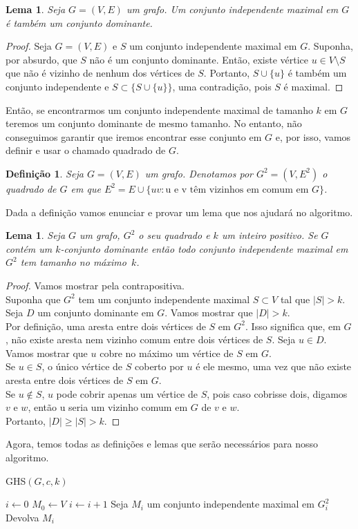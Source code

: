 \documentclass[12pt]{article}
\newtheorem{lemma}[theorem]{Lema}
\newtheorem{definition}[theorem]{Definição}
\begin{document}
\begin{lemma}\label{lemma:2.8}
    Seja $G = (V,E)$ um grafo. Um conjunto independente maximal em $G$ é também um conjunto dominante.
\end{lemma}
\begin{proof}
    Seja $G = (V,E)$ e $S$ um conjunto independente maximal em $G$. Suponha, por absurdo, que $S$ não é um conjunto dominante. Então, existe vértice $u \in V \setminus S$ que não é vizinho de nenhum dos vértices de $S$. Portanto, $S \cup \{u\}$ é também um conjunto independente e $S \subset \{S \cup \{u\}\}$, uma contradição, pois $S$ é maximal.
\end{proof}
Então, se encontrarmos um conjunto independente maximal de tamanho $k$ em $G$ teremos um conjunto dominante de mesmo tamanho. No entanto, não conseguimos garantir que iremos encontrar esse conjunto em $G$ e, por isso, vamos definir e usar o chamado quadrado de $G$.
\begin{definition}
    Seja $G= (V,E)$ um grafo. Denotamos por $G^2 = (V,E^2)$ o \emph{quadrado} de $G$ em que $E^2 = E \cup \{uv: \text{u e v têm vizinhos em comum em $G$}\}$.
\end{definition}
Dada a definição vamos enunciar e provar um lema que nos ajudará no algoritmo.
\begin{lemma}\label{lemma:2.10}
    Seja $G$ um grafo, $G^2$ o seu quadrado e $k$ um inteiro positivo. Se $G$ contém um $k$-conjunto dominante então todo conjunto independente maximal em $G^2$ tem tamanho no máximo~$k$.
\end{lemma}
\begin{proof}
    Vamos mostrar pela contrapositiva.\\
    Suponha que $G^2$ tem um conjunto independente maximal $S \subset V$ tal que $|S| > k$. Seja $D$ um conjunto dominante em $G$. Vamos mostrar que $|D| > k$. \\
    Por definição, uma aresta entre dois vértices de $S$ em $G^2$. Isso significa que, em $G$, não existe aresta nem vizinho comum entre dois vértices de $S$. Seja $u \in D$. Vamos mostrar que $u$ cobre no máximo um vértice de $S$ em $G$. \\
    Se $u \in S$, o único vértice de $S$ coberto por $u$ é ele mesmo, uma vez que não existe aresta entre dois vértices de $S$ em $G$. \\
    Se $u \not \in S$, $u$ pode cobrir apenas um vértice de $S$, pois caso cobrisse dois, digamos $v$ e $w$, então u seria um vizinho comum em $G$ de $v$ e $w$.\\
    Portanto, $|D| \geq |S| > k$.
\end{proof}
Agora, temos todas as definições e lemas que serão necessários para nosso algoritmo.
\begin{algorithm}
    \caption{GHS$(G,c,k)$}
    \label{k-center:bottleneck}
    \begin{algorithmic}[1]
        \State $i \leftarrow 0$
        \State $M_0 \leftarrow V$
            \State $i\leftarrow i + 1$
            \State Seja $M_i$ um conjunto independente maximal em $G_i^2$
        \EndWhile
        \State Devolva $M_i$
    \end{algorithmic}
\end{algorithm}
\end{document}

